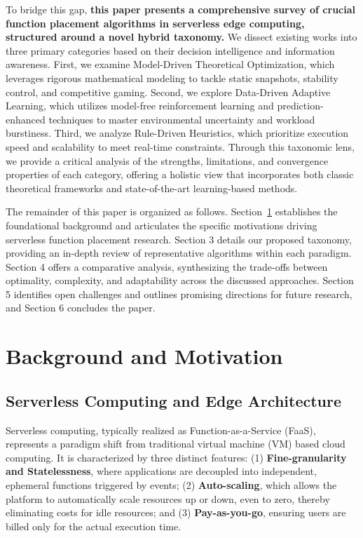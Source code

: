 \documentclass[lettersize,journal]{IEEEtran}
\begin{document}
To bridge this gap, \textbf{this paper presents a comprehensive survey of crucial function placement algorithms in serverless edge computing, structured around a novel hybrid taxonomy.} We dissect existing works into three primary categories based on their decision intelligence and information awareness. First, we examine Model-Driven Theoretical Optimization, which leverages rigorous mathematical modeling to tackle static snapshots, stability control, and competitive gaming. Second, we explore Data-Driven Adaptive Learning, which utilizes model-free reinforcement learning and prediction-enhanced techniques to master environmental uncertainty and workload burstiness. Third, we analyze Rule-Driven Heuristics, which prioritize execution speed and scalability to meet real-time constraints. Through this taxonomic lens, we provide a critical analysis of the strengths, limitations, and convergence properties of each category, offering a holistic view that incorporates both classic theoretical frameworks and state-of-the-art learning-based methods.

The remainder of this paper is organized as follows. Section~\ref{back} establishes the foundational background and articulates the specific motivations driving serverless function placement research. Section 3 details our proposed taxonomy, providing an in-depth review of representative algorithms within each paradigm. Section 4 offers a comparative analysis, synthesizing the trade-offs between optimality, complexity, and adaptability across the discussed approaches. Section 5 identifies open challenges and outlines promising directions for future research, and Section 6 concludes the paper.

\section{Background and Motivation}
\label{back}
\subsection{Serverless Computing and Edge Architecture}
Serverless computing, typically realized as Function-as-a-Service (FaaS), represents a paradigm shift from traditional virtual machine (VM) based cloud computing. It is characterized by three distinct features: (1) \textbf{Fine-granularity and Statelessness}, where applications are decoupled into independent, ephemeral functions triggered by events; (2) \textbf{Auto-scaling}, which allows the platform to automatically scale resources up or down, even to zero, thereby eliminating costs for idle resources; and (3) \textbf{Pay-as-you-go}, ensuring users are billed only for the actual execution time.
\end{document}
